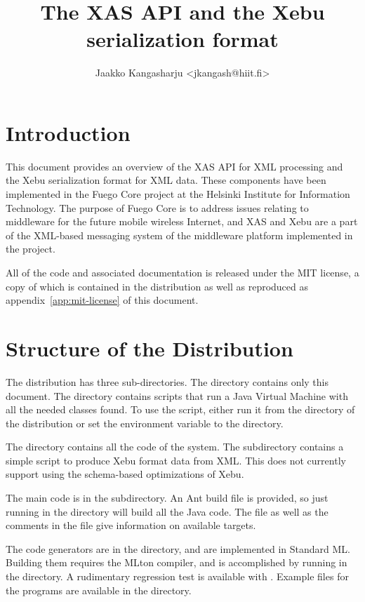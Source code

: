 \documentclass[draft]{article}
\title{The XAS API and the Xebu serialization format}
\author{Jaakko Kangasharju <jkangash@hiit.fi>}
\begin{document}
\maketitle

\section{Introduction}

This document provides an overview of the XAS API for XML processing
and the Xebu serialization format for XML data.  These components have
been implemented in the Fuego Core project at the Helsinki Institute
for Information Technology.  The purpose of Fuego Core is to address
issues relating to middleware for the future mobile wireless Internet,
and XAS and Xebu are a part of the XML-based messaging system of the
middleware platform implemented in the project.

All of the code and associated documentation is released under the MIT
license, a copy of which is contained in the distribution as well as
reproduced as appendix~\ref{app:mit-license} of this document.

\section{Structure of the Distribution}
\label{sec:structure}

The distribution has three sub-directories.  The  directory
contains only this document.  The  directory contains
scripts that run a Java Virtual Machine with all the needed classes
found.  To use the  script, either run it from the
 directory of the distribution or set the environment
variable  to the  directory.

The  directory contains all the code of the system.  The
 subdirectory contains a simple script to produce Xebu format
data from XML.  This does not currently support using the schema-based
optimizations of Xebu.

The main code is in the  subdirectory.  An Ant build file
is provided, so just running  in the  directory
will build all the Java code.  The  file as well as the
comments in the  file give information on available
targets.

The code generators are in the  directory, and are
implemented in Standard ML.  Building them requires the MLton
compiler, and is accomplished by running  in the 
directory.  A rudimentary regression test is available with .  Example files for the programs are available in the
 directory.
\end{document}
